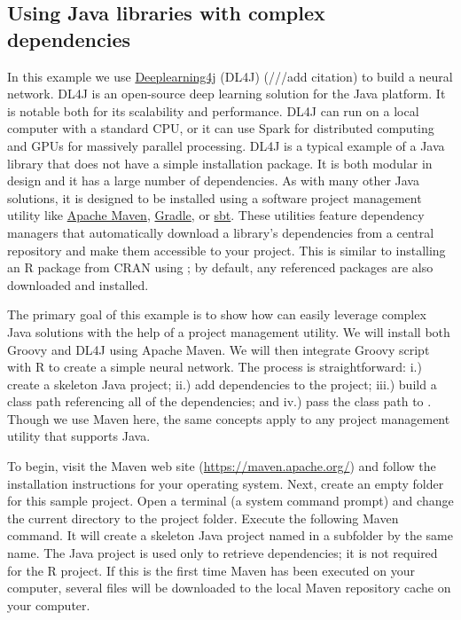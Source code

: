 \hypertarget{using-java-libraries-with-complex-dependencies}{}
\subsection{Using Java libraries with complex dependencies}

In this example we use \href{https://deeplearning4j.org/}{Deeplearning4j} (DL4J) (///add citation) to build a neural network. DL4J is an open-source deep learning solution for the Java platform. It is notable both for its scalability and performance. DL4J can run on a local computer with a standard CPU, or it can use Spark for distributed computing and GPUs for massively parallel processing. DL4J is a typical example of a Java library that does not have a simple installation package. It is both modular in design and it has a large number of dependencies. As with many other Java solutions, it is designed to be installed using a software project management utility like \href{https://maven.apache.org/}{Apache Maven}, \href{https://gradle.org/}{Gradle}, or \href{https://www.scala-sbt.org/}{sbt}. These utilities feature dependency managers that automatically download a library's dependencies from a central repository and make them accessible to your project. This is similar to installing an R package from CRAN using ; by default, any referenced packages are also downloaded and installed.

The primary goal of this example is to show how  can easily leverage complex Java solutions with the help of a project management utility. We will install both Groovy and DL4J using Apache Maven. We will then integrate Groovy script with R to create a simple neural network. The process is straightforward: i.) create a skeleton Java project; ii.) add dependencies to the project; iii.) build a class path referencing all of the dependencies; and iv.) pass the class path to . Though we use Maven here, the same concepts apply to any project management utility that supports Java.

To begin, visit the Maven web site (\url{https://maven.apache.org/}) and follow the installation instructions for your operating system. Next, create an empty folder for this sample project. Open a terminal (a system command prompt) and change the current directory to the project folder. Execute the following Maven command. It will create a skeleton Java project named  in a subfolder by the same name. The Java project is used only to retrieve dependencies; it is not required for the R project. If this is the first time Maven has been executed on your computer, several files will be downloaded to the local Maven repository cache on your computer.

